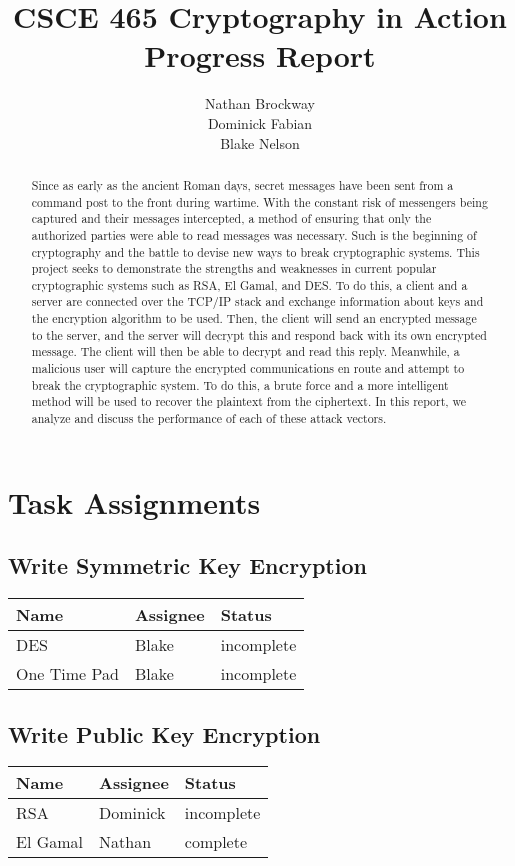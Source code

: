 \documentclass[12pt]{report}
\title{CSCE 465 Cryptography in Action Progress Report}
\author{Nathan Brockway\\Dominick Fabian\\Blake Nelson}
\begin{document}
\maketitle

\begin{abstract}
    Since as early as the ancient Roman days, secret messages have been sent from a command post to the front during wartime. With the constant risk of messengers being captured and their messages intercepted, a method of ensuring that only the authorized parties were able to read messages was necessary. Such is the beginning of cryptography and the battle to devise new ways to break cryptographic systems. This project seeks to demonstrate the strengths and weaknesses in current popular cryptographic systems such as RSA, El Gamal, and DES. To do this, a client and a server are connected over the TCP/IP stack and exchange information about keys and the encryption algorithm to be used. Then, the client will send an encrypted message to the server, and the server will decrypt this and respond back with its own encrypted message. The client will then be able to decrypt and read this reply. Meanwhile, a malicious user will capture the encrypted communications en route and attempt to break the cryptographic system. To do this, a brute force and a more intelligent method will be used to recover the plaintext from the ciphertext. In this report, we analyze and discuss the performance of each of these attack vectors.
\end{abstract}

\section{Task Assignments}
\subsection{Write Symmetric Key Encryption}
\begin{tabular}{l|l|l}
    Name & Assignee & Status \\ \hline
    DES & Blake & incomplete \\
    One Time Pad & Blake & incomplete	 
\end{tabular}

\subsection{Write Public Key Encryption}
\begin{tabular}{l|l|l}
    Name & Assignee & Status \\ \hline
    RSA & Dominick & incomplete \\
    El Gamal & Nathan & complete
\end{tabular}
\end{document}
